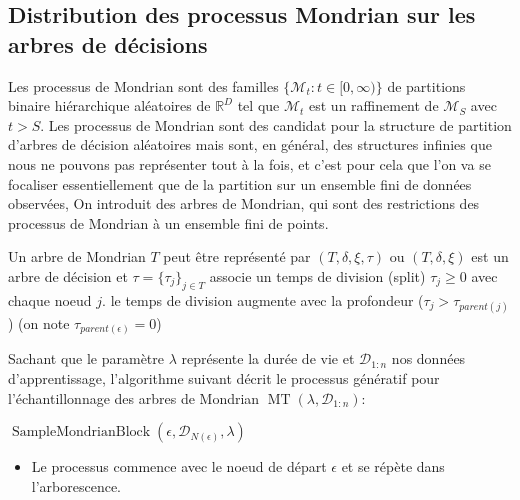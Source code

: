 \subsection{Distribution des processus Mondrian sur les arbres de décisions}

Les processus de Mondrian sont des familles $\{\mathcal{M}_t:t\in[0,\infty)\}$ de partitions binaire hiérarchique aléatoires de $\mathbb{R}^D$ tel que $\mathcal{M}_t$ est un raffinement de $\mathcal{M}_S$ avec $t>S$.
Les processus de Mondrian sont des  candidat pour la structure de partition d'arbres de décision aléatoires mais sont, en général, des structures infinies que nous ne pouvons pas représenter tout à la fois, et c'est pour cela que l'on va se focaliser essentiellement que de la partition sur un ensemble fini de données observées, On introduit des arbres de Mondrian, qui sont des restrictions des processus de Mondrian à un ensemble fini de points.

Un arbre de Mondrian $T$ peut être représenté par $(T,\delta,\xi,\tau)$ ou $(T,\delta,\xi)$ est un arbre de décision et $\tau=\{\tau_j\}_{j\in T}$ associe un temps de division (split) $\tau_j\ge 0$ avec chaque noeud $j$. le temps de division augmente avec la profondeur ($\tau_j>\tau_{parent(j)}$) (on note $\tau_{parent(\epsilon)}=0$)

Sachant que le paramètre $\lambda$ représente la durée de vie et $\mathcal{D}_{1:n}$ nos données d'apprentissage, l'algorithme suivant décrit le processus génératif
pour l'échantillonnage des arbres de Mondrian $\operatorname{MT}(\lambda,\mathcal{D}_{1:n})$:

{\fontsize{4}{4}\selectfont
\begin{algorithm}[h]
\caption{\textsc{$\operatorname{SampleMondrianTree}(\lambda,\mathcal{D}_{1:n})$}}
%

$\operatorname{SampleMondrianBlock}(\epsilon,\mathcal{D}_{N(\epsilon)},\lambda)$

\end{algorithm}
}

\begin{itemize}
    \item Le processus commence avec le noeud de départ $\epsilon$ et se répète dans l'arborescence.
\end{itemize}


